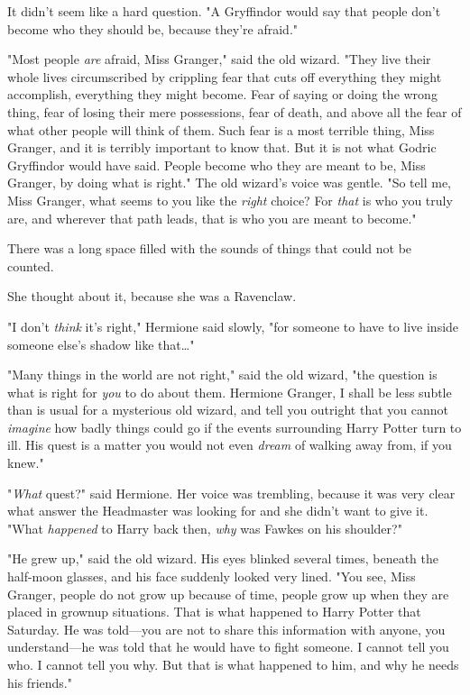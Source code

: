 It didn't seem like a hard question. "A Gryffindor would say that people don't
become who they should be, because they're afraid."

"Most people \emph{are} afraid, Miss Granger," said the old wizard. "They live
their whole lives circumscribed by crippling fear that cuts off everything they
might accomplish, everything they might become. Fear of saying or doing the
wrong thing, fear of losing their mere possessions, fear of death, and above
all the fear of what other people will think of them. Such fear is a most
terrible thing, Miss Granger, and it is terribly important to know that. But it
is not what Godric Gryffindor would have said. People become who they are meant
to be, Miss Granger, by doing what is right." The old wizard's voice was
gentle. "So tell me, Miss Granger, what seems to you like the \emph{right}
choice? For \emph{that} is who you truly are, and wherever that path leads,
that is who you are meant to become."

There was a long space filled with the sounds of things that could not be
counted.

She thought about it, because she was a Ravenclaw.

"I don't \emph{think} it's right," Hermione said slowly, "for someone to have
to live inside someone else's shadow like that{\ldots}"

"Many things in the world are not right," said the old wizard, "the question is
what is right for \emph{you} to do about them. Hermione Granger, I shall be
less subtle than is usual for a mysterious old wizard, and tell you outright
that you cannot \emph{imagine} how badly things could go if the events
surrounding Harry Potter turn to ill. His quest is a matter you would not even
\emph{dream} of walking away from, if you knew."

"\emph{What} quest?" said Hermione. Her voice was trembling, because it was
very clear what answer the Headmaster was looking for and she didn't want to
give it. "What \emph{happened} to Harry back then, \emph{why} was Fawkes on his
shoulder?"

"He grew up," said the old wizard. His eyes blinked several times, beneath the
half-moon glasses, and his face suddenly looked very lined. "You see, Miss
Granger, people do not grow up because of time, people grow up when they are
placed in grownup situations. That is what happened to Harry Potter that
Saturday. He was told---you are not to share this information with anyone, you
understand---he was told that he would have to fight someone. I cannot tell you
who. I cannot tell you why. But that is what happened to him, and why he needs
his friends."


